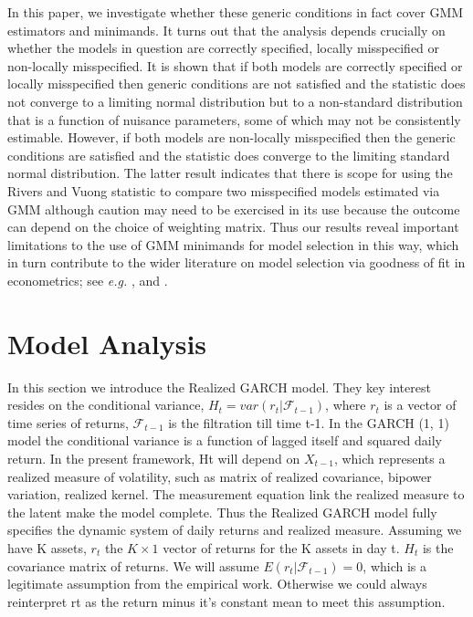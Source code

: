 \documentclass[titlepage,11pt]{article}
\begin{document}
In this paper, we investigate whether these generic conditions in fact cover GMM estimators and minimands. It turns out that the analysis depends crucially on whether the models in question are  correctly specified, locally misspecified or non-locally misspecified. It is shown that if both models are correctly specified or locally misspecified then  generic conditions are not satisfied and the statistic does not converge to a limiting normal distribution but to a non-standard distribution that is a function of nuisance parameters, some of which may not be consistently estimable. However, if both models are non-locally misspecified then the generic conditions are satisfied and the  statistic does converge to the limiting standard normal distribution. The latter result indicates
that there is scope for using the Rivers and Vuong statistic to compare two misspecified models estimated via GMM although caution may need to be exercised in its use because the outcome can depend on the choice of weighting matrix. Thus our results reveal important limitations to the use of GMM minimands for model selection in this way, which in turn contribute to the wider literature on model selection via goodness of fit in econometrics; see {\it e.g.} ,  and .

\section{Model Analysis}
In this section we introduce the Realized GARCH model. They key interest resides on the conditional variance, $H_t=var(r_t|\mathcal{F}_{t-1})$, where $r_t$ is a vector of time series of returns, $\mathcal{F}_{t-1}$ is the filtration till time t-1. In the GARCH (1, 1) model the conditional variance is a function of lagged itself and squared daily return. In the present framework, Ht will depend on $X_{t-1}$, which represents a realized measure of volatility, such as matrix of realized covariance, bipower variation, realized kernel. The measurement equation link the realized measure to the latent make the model complete. Thus the Realized GARCH model fully specifies the dynamic system of daily returns and realized measure.
Assuming we have K assets, $r_t$ the $K \times 1$ vector of returns for the K assets in day t. $H_t$ is the covariance matrix of returns. We will assume $E(r_t|\mathcal{F}_{t-1})=0 $, which is a legitimate assumption from the empirical work. Otherwise we could always reinterpret rt as the return minus it’s constant mean to meet this assumption. 
\end{document}
